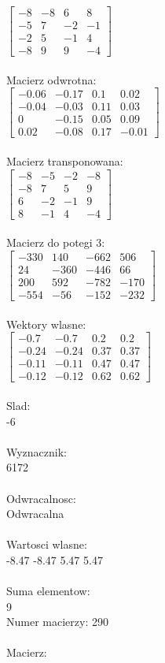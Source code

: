 \documentclass[a4paper,12pt]{article}
\begin{document}
$\begin{bmatrix} -8&-8&6&8\\-5&7&-2&-1\\-2&5&-1&4\\-8&9&9&-4 \end{bmatrix}$
\\
\\
Macierz odwrotna:\\

$\begin{bmatrix} -0.06&-0.17&0.1&0.02\\-0.04&-0.03&0.11&0.03\\0&-0.15&0.05&0.09\\0.02&-0.08&0.17&-0.01 \end{bmatrix}$
\\
\\
Macierz transponowana:\\

$\begin{bmatrix} -8&-5&-2&-8\\-8&7&5&9\\6&-2&-1&9\\8&-1&4&-4 \end{bmatrix}$
\\
\\
Macierz do potegi 3:\\

$\begin{bmatrix} -330&140&-662&506\\24&-360&-446&66\\200&592&-782&-170\\-554&-56&-152&-232 \end{bmatrix}$
\\
\\
Wektory wlasne:\\

$\begin{bmatrix} -0.7&-0.7&0.2&0.2\\-0.24&-0.24&0.37&0.37\\-0.11&-0.11&0.47&0.47\\-0.12&-0.12&0.62&0.62 \end{bmatrix}$
\\
\\
Slad:\\
-6
\\
\\
Wyznacznik:\\
6172
\\
\\
Odwracalnosc:\\
Odwracalna
\\
\\
Wartosci wlasne:\\
-8.47 -8.47 5.47 5.47
\\
\\
Suma elementow:\\
9
\\
\newpage
Numer macierzy:
290
\\
\\
Macierz:\\
\end{document}
